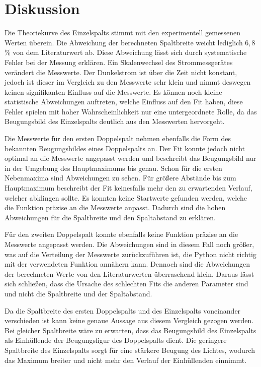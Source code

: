 \section{Diskussion}
\label{sec:Diskussion}

Die Theoriekurve des Einzelspalts stimmt mit den experimentell gemessenen Werten überein. Die Abweichung der berechneten Spaltbreite weicht lediglich
$6,8\,$\% von dem Literaturwert ab. Diese Abweichung lässt sich durch systematische Fehler bei der Messung erklären. Ein Skalenwechsel des
Strommessgerätes verändert die Messwerte. Der Dunkelstrom ist über die Zeit nicht konstant, jedoch ist dieser im Vergleich zu
den Messwerte sehr klein und nimmt deswegen keinen signifikanten Einfluss auf die Messwerte. Es können noch kleine
statistische Abweichungen auftreten, welche Einfluss auf den Fit haben, diese Fehler spielen mit hoher Wahrscheinlichkeit nur eine untergeordnete
Rolle, da das Beugungsbild des Einzelspalts deutlich aus den Messwerten hervorgeht.

Die Messwerte für den ersten Doppelspalt nehmen ebenfalls die Form des bekannten Beugungsbildes eines Doppelspalts an. Der Fit konnte jedoch nicht
optimal an die Messwerte angepasst werden und beschreibt das Beugungsbild nur in der Umgebung des Hauptmaximums bis genau. Schon für
die ersten Nebenmaxima sind Abweichungen zu sehen. Für größere Abstände bis zum Hauptmaximum beschreibt der Fit keinesfalls mehr den zu erwartenden Verlauf, welcher
abklingen sollte. Es konnten keine Startwerte gefunden werden, welche die Funktion präzise an die Messwerte anpasst.
Dadurch sind die hohen Abweichungen für die Spaltbreite und den Spaltabstand zu erklären.

Für den zweiten Doppelspalt konnte ebenfalls keine Funktion präzise an die Messwerte angepasst werden. Die Abweichungen sind in diesem Fall noch größer,
was auf die Verteilung der Messwerte zurückzuführen ist, die Python nicht richtig mit der verwendeten Funktion annähern kann.
Dennoch sind die Abweichungen der berechneten Werte von den Literaturwerten überraschend klein. Daraus lässt sich schließen, dass
die Ursache des schlechten Fits die anderen Parameter sind und nicht die Spaltbreite und der Spaltabstand.


Da die Spaltbreite des ersten Doppelspalts und des Einzelspalts voneinander verschieden ist kann keine genaue Aussage aus diesem Vergleich gezogen werden.
Bei gleicher Spaltbreite wäre zu erwarten, dass das Beugungsbild des Einzelspalts als Einhüllende der Beugungsfigur des Doppelspalts dient.
Die geringere Spaltbreite des Einzelspalts sorgt für eine stärkere Beugung des Lichtes, wodurch das Maximum breiter und nicht mehr den
Verlauf der Einhüllenden einnimmt.
